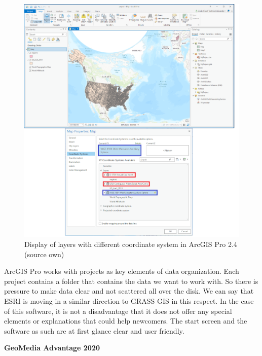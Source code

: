 \documentclass[a4paper,10pt,twoside]{article}
\begin{document}
\newpage
\begin{figure}[hbt!] 
\begin{center}
\includegraphics[width=16cm]{../pictures/arcgis_pro_onthefly2.png} 
\caption[Display of layers with different coordinate system in ArcGIS Pro 2.4 (source own)]{Display of layers with different coordinate system in ArcGIS Pro 2.4 (source own)}
\label{fig:arcgis_pro_onthefly2}
\end{center}
\end{figure}

\noindent ArcGIS Pro works with projects as key elements of data organization. Each project contains a folder that contains the data we want to work with. So there is pressure to make data clear and not scattered all over the disk. We can say that ESRI is moving in a similar direction to GRASS GIS in this respect. In the case of this software, it is not a disadvantage that it does not offer any special elements or explanations that could help newcomers. The start screen and the software as such are at first glance clear and user friendly.

\newpage
\vspace*{-1cm}
\bigskip
\noindent \textbf {GeoMedia Advantage 2020}
\end{document}
